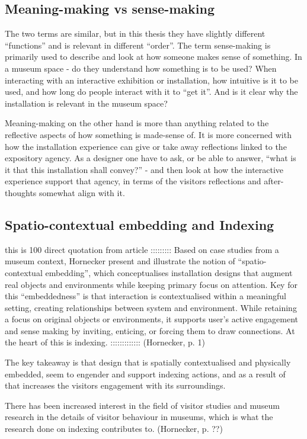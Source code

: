 \subsection{Meaning-making vs sense-making}
The two terms are similar, but in this thesis they have slightly different “functions” and is relevant in different “order”. The term sense-making is primarily used to describe and look at how someone makes sense of something. In a museum space - do they understand how something is to be used? When interacting with an interactive exhibition or installation, how intuitive is it to be used, and how long do people interact with it to “get it”. And is it clear why the installation is relevant in the museum space?

Meaning-making on the other hand is more than anything related to the reflective aspects of how something is made-sense of. It is more concerned with how the installation experience can give or take away reflections linked to the expository agency. As a designer one have to ask, or be able to answer, “what is it that this installation shall convey?” - and then look at how the interactive experience support that agency, in terms of the visitors reflections and after-thoughts somewhat align with it.

\subsection{Spatio-contextual embedding and Indexing}

this is 100 direct quotation from article ::::::::: Based on case studies from a museum context, Hornecker present and illustrate the notion of “spatio-contextual embedding”, which conceptualises installation designs that augment real objects and environments while keeping primary focus on attention. Key for this “embeddedness” is that interaction is contextualised within a meaningful setting, creating relationships between system and environment. While retaining a focus on original objects or environments, it supports user’s active engagement and sense making by inviting, enticing, or forcing them to draw connections. At the heart of this is indexing. ::::::::::::: (Hornecker, p. 1)

The key takeaway is that design that is spatially contextualised and physically embedded, seem to engender and support indexing actions, and as a result of that increases the visitors engagement with its surroundings.

There has been increased interest in the field of visitor studies and museum research in the details of visitor behaviour in museums, which is what the research done on indexing contributes to. (Hornecker, p. ??)

